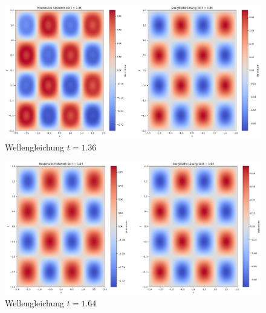 \begin{figure}
    \centering
    \includegraphics[width=\textwidth]{papers/neuronal/images/prediction_wave_t136.png}
    \caption{Wellengleichung $t = 1.36$}
    \label{fig:wellen_t136}
\end{figure}
\begin{figure}
    \centering
    \includegraphics[width=\textwidth]{papers/neuronal/images/prediction_wave_t164.png}
    \caption{Wellengleichung $t = 1.64$}
    \label{fig:wellen_t164}
\end{figure}

